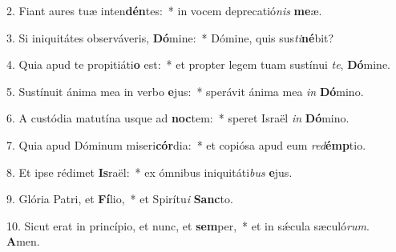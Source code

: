 2. Fiant aures tuæ inten\textbf{dén}tes:~*  in vocem deprecatió\textit{nis} \textbf{me}æ.\

3. Si iniquitátes observáveris, \textbf{Dó}mine:~*  Dómine, quis sus\textit{ti}\textbf{né}bit?\

4. Quia apud te propitiáti\textbf{o} est:~*  et propter legem tuam sustínui \textit{te}, \textbf{Dó}mine.\

5. Sustínuit ánima mea in verbo \textbf{e}jus:~*  sperávit ánima mea \textit{in} \textbf{Dó}mino.\

6. A custódia matutína usque ad \textbf{noc}tem:~*  speret Israël \textit{in} \textbf{Dó}mino.\

7. Quia apud Dóminum miseri\textbf{cór}dia:~*  et copiósa apud eum \textit{red}\textbf{émp}tio.\

8. Et ipse rédimet \textbf{Is}raël:~*  ex ómnibus iniquitáti\textit{bus} \textbf{e}jus.\

9. Glória Patri, et \textbf{Fí}lio,~*  et Spirítu\textit{i} \textbf{Sanc}to.\

10. Sicut erat in princípio, et nunc, et \textbf{sem}per,~*  et in sǽcula sæculó\textit{rum}. \textbf{A}men.\


